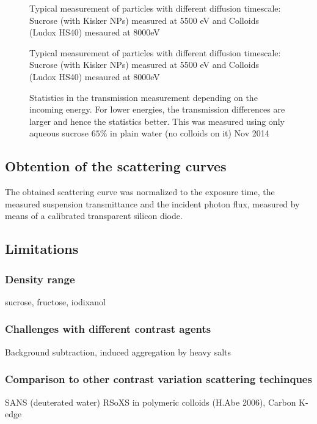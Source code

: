 \begin{figure}%
	\centering
		
		\caption{Typical measurement of particles with different diffusion timescale: Sucrose (with Kisker NPs) measured at 5500 eV and Colloids (Ludox HS40) mesaured at 8000eV}
		\label{fig:LudoxHS40TransmissionCalibration}
\end{figure}

\begin{figure}%
	\centering
		
		\caption{Typical measurement of particles with different diffusion timescale: Sucrose (with Kisker NPs) measured at 5500 eV and Colloids (Ludox HS40) mesaured at 8000eV}
		\label{fig:KiskerTransmissionCalibration}
\end{figure}

\begin{figure}%
	\centering
	\caption{Statistics in the transmission measurement depending on the incoming energy. For lower energies, the transmission differences are larger and hence the statistics better. This was measured using only aqueous sucrose $65\%$ in plain water (no colloids on it) Nov 2014}
\end{figure}

\subsection{Obtention of the scattering curves}

The obtained scattering curve was normalized to the exposure time, the measured suspension transmittance and the incident photon flux, measured by means of a calibrated transparent silicon diode. 

\subsection{Limitations}
\subsubsection{Density range}
sucrose, fructose, iodixanol
\subsubsection{Challenges with different contrast agents}
Background subtraction, induced aggregation by heavy salts
\subsubsection{Comparison to other contrast variation scattering techinques}
SANS (deuterated water)
RSoXS in polymeric colloids (H.Abe 2006), Carbon K-edge

